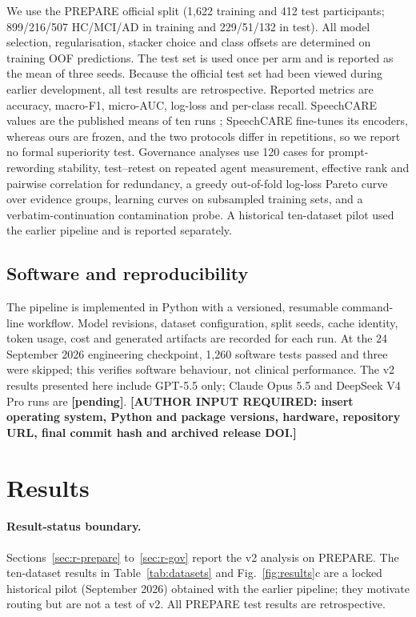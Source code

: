 \documentclass[pdflatex,sn-nature]{sn-jnl}
\begin{document}
We use the PREPARE official split (1,622 training and 412 test participants; 899/216/507 HC/MCI/AD in training and 229/51/132 in test). All model selection, regularisation, stacker choice and class offsets are determined on training OOF predictions. The test set is used once per arm and is reported as the mean of three seeds. Because the official test set had been viewed during earlier development, all test results are retrospective. Reported metrics are accuracy, macro-F1, micro-AUC, log-loss and per-class recall. SpeechCARE values are the published means of ten runs \cite{Azadmaleki2025}; SpeechCARE fine-tunes its encoders, whereas ours are frozen, and the two protocols differ in repetitions, so we report no formal superiority test. Governance analyses use 120 cases for prompt-rewording stability, test--retest on repeated agent measurement, effective rank and pairwise correlation for redundancy, a greedy out-of-fold log-loss Pareto curve over evidence groups, learning curves on subsampled training sets, and a verbatim-continuation contamination probe. A historical ten-dataset pilot used the earlier pipeline and is reported separately.

\subsection{Software and reproducibility}

The pipeline is implemented in Python with a versioned, resumable command-line workflow. Model revisions, dataset configuration, split seeds, cache identity, token usage, cost and generated artifacts are recorded for each run. At the 24 September 2026 engineering checkpoint, 1,260 software tests passed and three were skipped; this verifies software behaviour, not clinical performance. The v2 results presented here include GPT-5.5 only; Claude Opus 5.5 and DeepSeek V4 Pro runs are \textbf{[pending]}. \textbf{[AUTHOR INPUT REQUIRED: insert operating system, Python and package versions, hardware, repository URL, final commit hash and archived release DOI.]}

\section{Results}\label{sec:results}

\paragraph{Result-status boundary.}
Sections~\ref{sec:r-prepare} to~\ref{sec:r-gov} report the v2 analysis on PREPARE. The ten-dataset results in Table~\ref{tab:datasets} and Fig.~\ref{fig:results}c are a locked historical pilot (September 2026) obtained with the earlier pipeline; they motivate routing but are not a test of v2. All PREPARE test results are retrospective.
\end{document}
